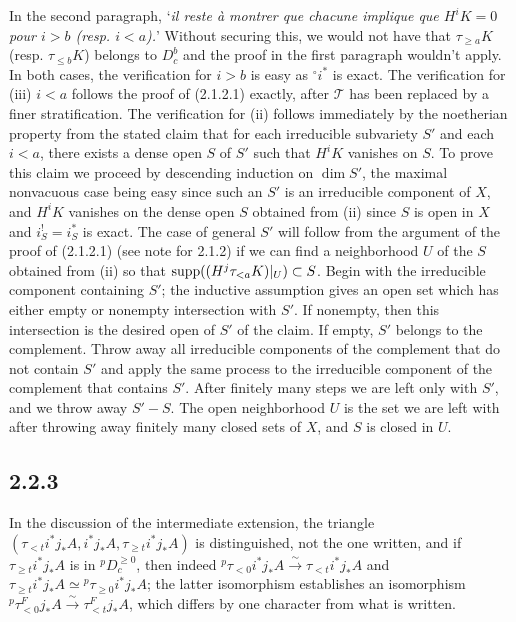 \documentclass[deligne.tex]{subfiles}
\begin{document}
	In the second paragraph, `\emph{il reste à montrer que chacune implique 
	que $H^iK=0$ pour $i>b$ (resp. $i<a$).}' Without securing this, we would 
	not have that $\tau_{\geq a}K$ (resp. $\tau_{\leq b}K$) belongs to 
	$D^b_c$ and the proof in the first paragraph wouldn't apply.
	In both cases, the verification for $i>b$ is easy as $^\circ i^*$ is
	exact.
	The verification for (iii) $i<a$ follows the proof of (2.1.2.1) exactly, 
	after $\mathcal T$ has been replaced by a finer stratification.
	The verification for (ii) follows immediately by the noetherian property
	from the stated claim that for each irreducible subvariety $S'$ and each
	$i<a$, there exists a dense open $S$ of $S'$ such that $H^iK$ vanishes on 
	$S$. To prove this claim we proceed by descending induction on $\dim S'$,
	the maximal nonvacuous case being easy since such an $S'$ is an 
	irreducible component of $X$, and $H^iK$ vanishes on the dense open $S$ 
	obtained from (ii) since $S$ is open in $X$ and $i_S^!=i_S^*$ is exact.
	The case of general $S'$ will follow from the argument of the proof of 
	(2.1.2.1) (see note for 2.1.2) if we can find a neighborhood $U$ of the 
	$S$ obtained from (ii) so that $\operatorname{supp}((H^j\tau_{<a}K)|_U)\subset S$.
	Begin with the irreducible component containing $S'$; the 
	inductive assumption gives an open set which has either empty or nonempty 
	intersection with $S'$. If nonempty, then this intersection is the 
	desired open of $S'$ of the claim.
	If empty, $S'$ belongs to the complement. Throw away all irreducible
	components of the complement that do not contain $S'$ and apply the same
	process to the irreducible component of the complement that contains 
	$S'$. After finitely many steps we are left only with $S'$, and we throw
	away $S'-S$. The open neighborhood $U$ is the set we are left with after 
	throwing away finitely many closed sets of $X$, and $S$ is closed in $U$.
	
	\subsection*{2.2.3} In the discussion of the intermediate extension,
	the triangle $(\tau_{<t}i^*j_*A,i^*j_*A,\tau_{\geq t}i^*j_*A)$ is 
	distinguished, not the one written, and if $\tau_{\geq t}i^*j_*A$ is in
	$^pD_c^{\geq0}$, then indeed
	$^p\tau_{<0}i^*j_*A\xrightarrow{\sim}\tau_{<t}i^*j_*A$
	and $\tau_{\geq t}i^*j_*A\simeq{}^p\tau_{\geq 0}i^*j_*A$; the latter
	isomorphism establishes an isomorphism
	$^p\tau_{<0}^Fj_*A\xrightarrow{\sim}\tau_{<t}^Fj_*A$, which differs
	by one character from what is written.
	
\end{document}
